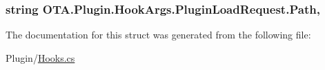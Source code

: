 \subsubsection[{Path}]{\setlength{\rightskip}{0pt plus 5cm}string O\+T\+A.\+Plugin.\+Hook\+Args.\+Plugin\+Load\+Request.\+Path\hspace{0.3cm}{\ttfamily [get]}, {\ttfamily [set]}}\label{struct_o_t_a_1_1_plugin_1_1_hook_args_1_1_plugin_load_request_a7e1897a0003060f73d166a3e4eb63508}


The documentation for this struct was generated from the following file\+:\begin{DoxyCompactItemize}
\item 
Plugin/\hyperlink{_hooks_8cs}{Hooks.\+cs}\end{DoxyCompactItemize}
